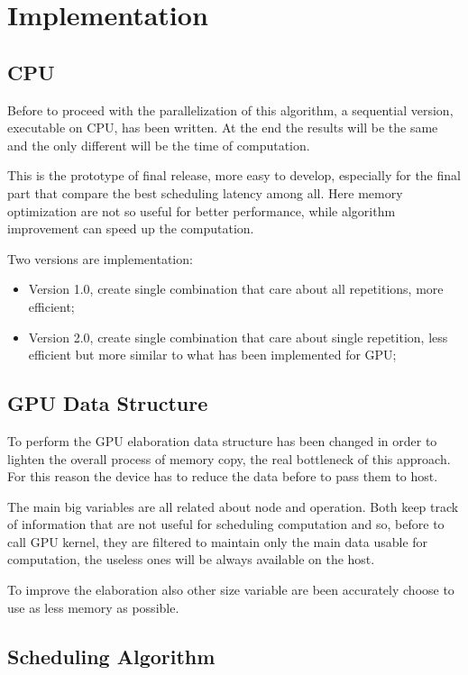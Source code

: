 \chapter{Implementation}
\label{chap3}

\section{CPU}

Before to proceed with the parallelization of this algorithm, a sequential version, executable on CPU, has been written.
At the end the results will be the same and the only different will be the time of computation.

This is the prototype of final release, more easy to develop, especially for the final
part that compare the best scheduling latency among all. Here memory optimization are not so useful for better performance, 
while algorithm improvement can speed up the computation.

Two versions are implementation:

\begin{itemize}
    \item Version 1.0, create single combination that care about all repetitions, more efficient;
    \item Version 2.0, create single combination that care about single repetition, less efficient but more 
    similar to what has been implemented for GPU;
\end{itemize}

\section{GPU Data Structure}

To perform the GPU elaboration data structure has been changed in order to lighten the overall process of memory copy,
the real bottleneck of this approach. For this reason the device has to reduce the data before to pass them to host.

The main big variables are all related about node and operation.
Both keep track of information that are not useful for scheduling computation and so, before to call GPU kernel,
they are filtered to maintain only the main data usable for computation, the useless ones will be always available on the host.

To improve the elaboration also other size variable are been accurately choose to use as less memory as possible.

\section{Scheduling Algorithm}

